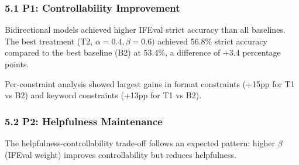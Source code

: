 
\subsubsection{5.1 P1: Controllability Improvement}

Bidirectional models achieved higher IFEval strict accuracy than all baselines. The best treatment (T2, $\alpha =0.4, \beta =0.6)$ achieved 56.8\% strict accuracy compared to the best baseline (B2) at 53.4\%, a difference of +3.4 percentage points.

\begin{table}[htbp]
\centering
{}
\end{table}

Per-constraint analysis showed largest gains in format constraints (+15pp for T1 vs B2) and keyword constraints (+13pp for T1 vs B2).

\subsubsection{5.2 P2: Helpfulness Maintenance}

The helpfulness-controllability trade-off follows an expected pattern: higher $\beta$ (IFEval weight) improves controllability but reduces helpfulness.

\begin{table}[htbp]
\centering
{}
\end{table}

